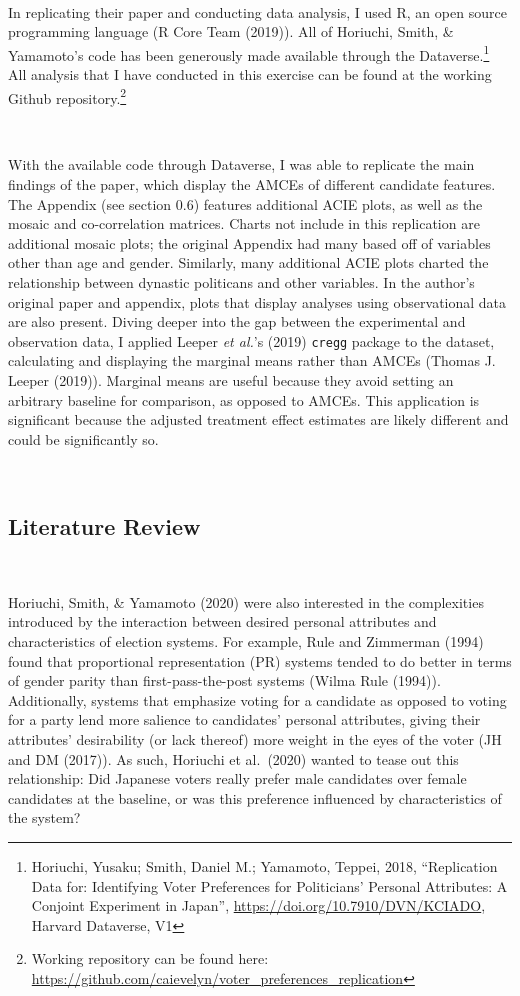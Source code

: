 \documentclass[
]{article}
\begin{document}
~

In replicating their paper and conducting data analysis, I used R, an open source programming language (R Core Team (2019)). All of Horiuchi, Smith, \& Yamamoto's code has been generously made available through the Dataverse.\footnote{Horiuchi, Yusaku; Smith, Daniel M.; Yamamoto, Teppei, 2018, ``Replication Data for: Identifying Voter Preferences for Politicians' Personal Attributes: A Conjoint Experiment in Japan'', \url{https://doi.org/10.7910/DVN/KCIADO}, Harvard Dataverse, V1} All analysis that I have conducted in this exercise can be found at the working Github repository.\footnote{Working repository can be found here: \url{https://github.com/caievelyn/voter_preferences_replication}}

~

With the available code through Dataverse, I was able to replicate the main findings of the paper, which display the AMCEs of different candidate features. The Appendix (see section 0.6) features additional ACIE plots, as well as the mosaic and co-correlation matrices. Charts not include in this replication are additional mosaic plots; the original Appendix had many based off of variables other than age and gender. Similarly, many additional ACIE plots charted the relationship between dynastic politicans and other variables. In the author's original paper and appendix, plots that display analyses using observational data are also present. Diving deeper into the gap between the experimental and observation data, I applied Leeper \emph{et al.}'s (2019) \texttt{cregg} package to the dataset, calculating and displaying the marginal means rather than AMCEs (Thomas J. Leeper (2019)). Marginal means are useful because they avoid setting an arbitrary baseline for comparison, as opposed to AMCEs. This application is significant because the adjusted treatment effect estimates are likely different and could be significantly so.

~

\hypertarget{literature-review}{%
\subsection{Literature Review}\label{literature-review}}

~

Horiuchi, Smith, \& Yamamoto (2020) were also interested in the complexities introduced by the interaction between desired personal attributes and characteristics of election systems. For example, Rule and Zimmerman (1994) found that proportional representation (PR) systems tended to do better in terms of gender parity than first-pass-the-post systems (Wilma Rule (1994)). Additionally, systems that emphasize voting for a candidate as opposed to voting for a party lend more salience to candidates' personal attributes, giving their attributes' desirability (or lack thereof) more weight in the eyes of the voter (JH and DM (2017)). As such, Horiuchi et al.~(2020) wanted to tease out this relationship: Did Japanese voters really prefer male candidates over female candidates at the baseline, or was this preference influenced by characteristics of the system?
\end{document}
